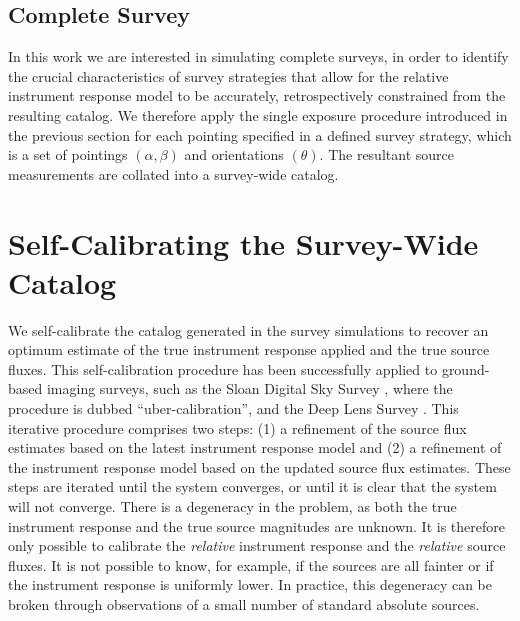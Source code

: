 \documentclass[preprint,pdftex]{aastex}
\begin{document}
\subsection{Complete Survey}
In this work we are interested in simulating complete surveys, in order to identify the crucial characteristics of survey strategies that allow for the relative instrument response model to be accurately, retrospectively constrained from the resulting catalog. We therefore apply the single exposure procedure introduced in the previous section for each pointing specified in a defined survey strategy, which is a set of pointings $(\alpha, \beta)$ and orientations $(\theta)$. The resultant source measurements are collated into a survey-wide catalog. 

\section{Self-Calibrating the Survey-Wide Catalog}
\label{sec:self_cal}
We self-calibrate the catalog generated in the survey simulations to recover an optimum estimate of the true instrument response applied and the true source fluxes. This self-calibration procedure has been successfully applied to ground-based imaging surveys, such as the Sloan Digital Sky Survey \citep{pad08}, where the procedure is dubbed ``uber-calibration'', and the Deep Lens Survey \citep{wit11}. This iterative procedure comprises two steps: (1) a refinement of the source flux estimates based on the latest instrument response model and (2) a refinement of the instrument response model based on the updated source flux estimates. These steps are iterated until the system converges, or until it is clear that the system will not converge. There is a degeneracy in the problem, as both the true instrument response and the true source magnitudes are unknown. It is therefore only possible to calibrate the \textit{relative} instrument response and the \textit{relative} source fluxes. It is not possible to know, for example, if the sources are all fainter or if the instrument response is uniformly lower. In practice, this degeneracy can be broken through observations of a small number of standard absolute sources.
\end{document}
